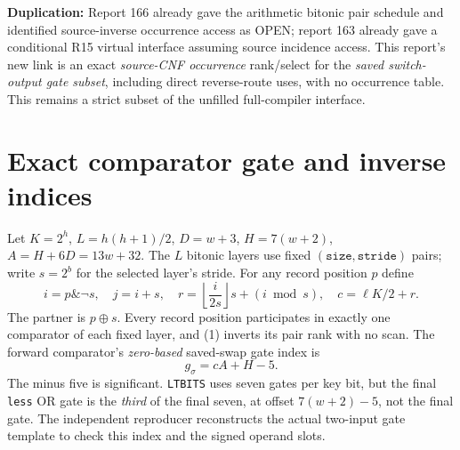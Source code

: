 \documentclass[11pt]{article}
\begin{document}
\textbf{Duplication:} Report 166 already gave the arithmetic bitonic
pair schedule and identified source-inverse occurrence access as OPEN;
report 163 already gave a conditional R15 virtual interface assuming
source incidence access. This report's new link is an exact
\emph{source-CNF occurrence} rank/select for the \emph{saved switch-output
gate subset}, including direct reverse-route uses, with no occurrence
table. This remains a strict subset of the unfilled full-compiler interface.

\section{Exact comparator gate and inverse indices}
Let $K=2^h$, $L=h(h+1)/2$, $D=w+3$, $H=7(w+2)$,
$A=H+6D=13w+32$. The $L$ bitonic layers use fixed
$(\texttt{size},\texttt{stride})$ pairs; write $s=2^b$ for the
selected layer's stride. For any record position $p$ define
\[
i=p\mathbin{\&}\neg s,\quad j=i+s,\quad
r=\left\lfloor\frac{i}{2s}\right\rfloor s+(i\bmod s),
\quad c=\ell K/2+r.                                      \tag{1}
\]
The partner is $p\oplus s$. Every record position participates in
exactly one comparator of each fixed layer, and (1) inverts its
pair rank with no scan. The forward comparator's \emph{zero-based}
saved-swap gate index is
\[
\boxed{g_\sigma=cA+H-5.}                                  \tag{2}
\]
The minus five is significant. \texttt{LTBITS} uses seven gates
per key bit, but the final \texttt{less} OR gate is the \emph{third}
of the final seven, at offset $7(w+2)-5$, not the final gate.
The independent reproducer reconstructs the actual two-input gate
template to check this index and the signed operand slots.
\end{document}
